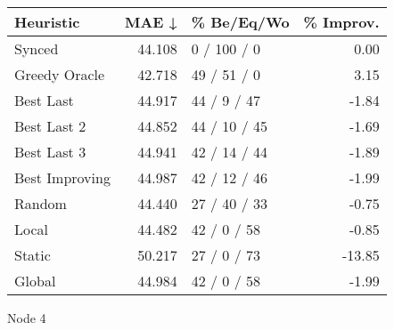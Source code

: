 \begin{tabular}{lrlr}
\toprule
\textbf{Heuristic} & \textbf{MAE ↓} & \textbf{\% Be/Eq/Wo} & \textbf{\% Improv.} \\
\midrule
            Synced &         44.108 &          0 / 100 / 0 &                0.00 \\
     Greedy Oracle &         42.718 &          49 / 51 / 0 &                3.15 \\
         Best Last &         44.917 &          44 / 9 / 47 &               -1.84 \\
       Best Last 2 &         44.852 &         44 / 10 / 45 &               -1.69 \\
       Best Last 3 &         44.941 &         42 / 14 / 44 &               -1.89 \\
    Best Improving &         44.987 &         42 / 12 / 46 &               -1.99 \\
            Random &         44.440 &         27 / 40 / 33 &               -0.75 \\
             Local &         44.482 &          42 / 0 / 58 &               -0.85 \\
            Static &         50.217 &          27 / 0 / 73 &              -13.85 \\
            Global &         44.984 &          42 / 0 / 58 &               -1.99 \\
\bottomrule
\end{tabular}
\caption{Node 4}
\label{tab:non_lr05_le2_bs2_4}
